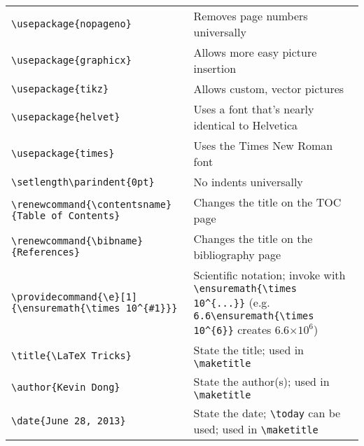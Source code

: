 \documentclass[10pt,letterpaper,landscape]{article}	%
\providecommand{\e}[1]{\ensuremath{\times 10^{#1}}}
\begin{document}
\begin{longtable}{ @{} l l @{} }
\lstinline!\usepackage{nopageno}! & Removes page numbers universally \\
\lstinline!\usepackage{graphicx}! & Allows more easy picture insertion \\
\lstinline!\usepackage{tikz}! & Allows custom, vector pictures \\
\lstinline!\usepackage{helvet}! & Uses a font that's nearly identical to Helvetica \\
\lstinline!\usepackage{times}! & Uses the Times New Roman font \\
\lstinline!\setlength\parindent{0pt}! & No indents universally \\
\lstinline!\renewcommand{\contentsname}{Table of Contents}! & Changes the title on the TOC page \\
\lstinline!\renewcommand{\bibname}{References}! & Changes the title on the bibliography page \\
\lstinline!\providecommand{\e}[1]{\ensuremath{\times 10^{#1}}}! & Scientific notation; invoke with \lstinline!\e{...}! (e.g. \lstinline!6.6\e{6}! creates 6.6\e{6})\\
\lstinline!\title{\LaTeX Tricks}! & State the title; used in \lstinline!\maketitle! \\
\lstinline!\author{Kevin Dong}! & State the author(s); used in \lstinline!\maketitle! \\
\lstinline!\date{June 28, 2013}! & State the date; \lstinline!\today! can be used; used in \lstinline!\maketitle! \\
\bottomrule
\end{longtable}
\end{document}
